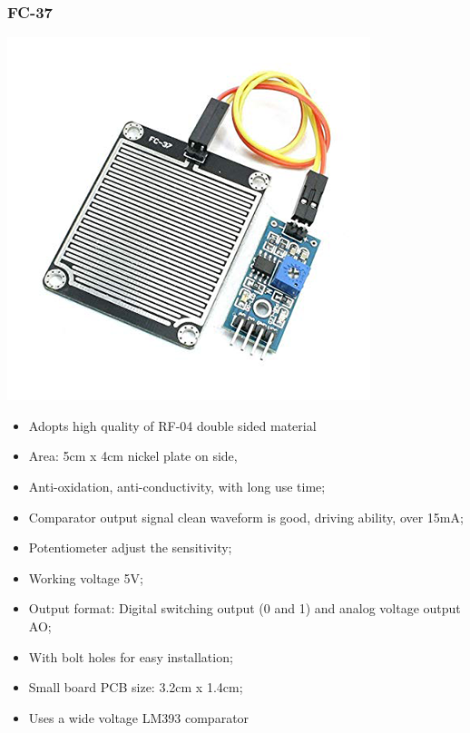\documentclass[12pt,a4paper,portrait]{article}
\begin{document}
			\subsubsection{FC-37}
				\begin{center}
					\includegraphics[scale=0.5]{./img/fc-37.png}
				\end{center}
			\begin{itemize}
				\item Adopts high quality of RF-04 double sided material
				\item Area: 5cm x 4cm nickel plate on side,
				\item Anti-oxidation, anti-conductivity, with long use time;
				\item Comparator output signal clean waveform is good, driving ability, over 15mA;
				\item Potentiometer adjust the sensitivity;
				\item Working voltage 5V;
				\item Output format: Digital switching output (0 and 1) and analog voltage output AO;
				\item With bolt holes for easy installation;
				\item Small board PCB size: 3.2cm x 1.4cm;
				\item Uses a wide voltage LM393 comparator
			\end{itemize}
\end{document}
